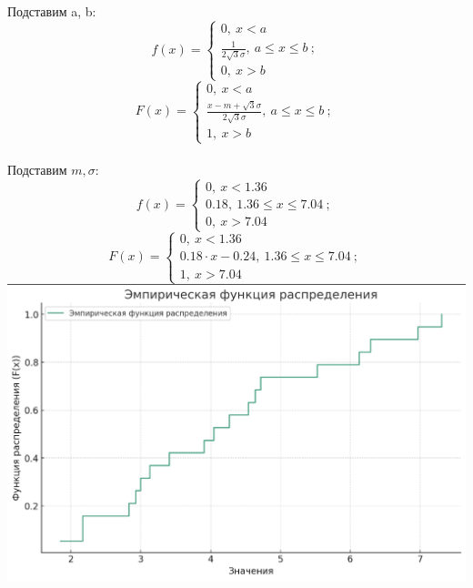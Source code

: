 \documentclass{article}
\begin{document}
Подставим a, b:
\[f(x) = 
\begin{cases}
    0,\ x<a\\
    \frac{1}{2\sqrt{3}\sigma},\ a\leq x\leq b\ ;\\
    0,\ x>b
\end{cases}
\] 
\[F(x) = 
\begin{cases}
    0,\ x<a\\
    \frac{x-m+\sqrt{3}\sigma}{2\sqrt{3}\sigma},\ a\leq x\leq b\ ;\\
    1,\ x>b
\end{cases}
\]
\\
Подставим $m, \sigma:$
\[f(x) = 
\begin{cases}
    0,\ x<1.36\\
    0.18,\ 1.36\leq x\leq 7.04\ ;\\
    0,\ x>7.04
\end{cases}
\] 
\[F(x) = 
\begin{cases}
    0,\ x<1.36\\
    0.18\cdot x- 0.24,\ 1.36\leq x\leq 7.04\ ;\\
    1,\ x>7.04
\end{cases}
\]
\newpage
\includegraphics[width=.9\textwidth]{emp.png}
\end{document}
